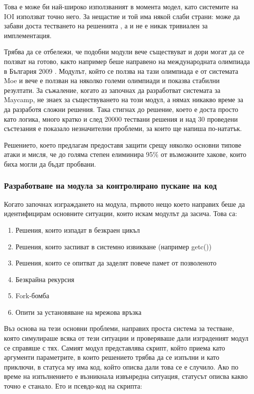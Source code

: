 \documentclass[a4paper,12pt]{article}
\begin{document}
  Това е може би най-широко използваният в момента модел, като системите на IOI използват точно него. За нещастие и той има някой слаби страни: може да забави доста тестването на решенията \cite{performance_reactive_tasks}, а и не е никак тривиален за имплементация.
  
  Трябва да се отбележи, че подобни модули вече съществуват и дори могат да се ползват на готово, както например беше направено на международната олимпиада в България 2009 \cite{validating_security}. Модулът, който се ползва на тази олимпиада е от системата Moe и вече е ползван на няколко големи олимпиади и показва стабилни резултати. За съжаление, когато аз започнах да разработват системата за Maycamp, не знаех за съществуването на този модул, а нямах никакво време за да разработя сложни решения. Така стигнах до решение, което е доста просто като логика, много кратко и след 20000 тествани решения и над 30 проведени състезания е показало незначителни проблеми, за които ще напиша по-нататък.
  
  Решението, което предлагам предоставя защити срещу няколко основни типове атаки и мисля, че до голяма степен елиминира 95\% от възможните хакове, които биха могли да бъдат пробвани.
  
  \subsubsection{Разработване на модула за контролирано пускане на код}
  Когато започнах изграждането на модула, първото нещо което направих беше да идентифицирам основните ситуации, които искам модулът да засича. Това са:
  
  \begin{enumerate}
    \item Решения, които изпадат в безкраен цикъл
    \item Решения, които заспиват в системно извикване (например getc())
    \item Решения, които се опитват да заделят повече памет от позволеното
    \item Безкрайна рекурсия
    \item Fork-бомба
    \item Опити за установяване на мрежова връзка
  \end{enumerate}
  
  Въз основа на тези основни проблеми, направих проста система за тестване, която симулираше всяка от тези ситуации и проверяваше дали изграденият модул се справяше с тях. Самият модул представлява скрипт, който приема като аргументи параметрите, в които решението трябва да се изпълни и като приключи, в статуса му има код, който описва дали това се е случило. Ако по време на изпълнението е възникнала извънредна ситуация, статусът описва какво точно е станало. Ето и псевдо-код на скрипта:
  
\end{document}
